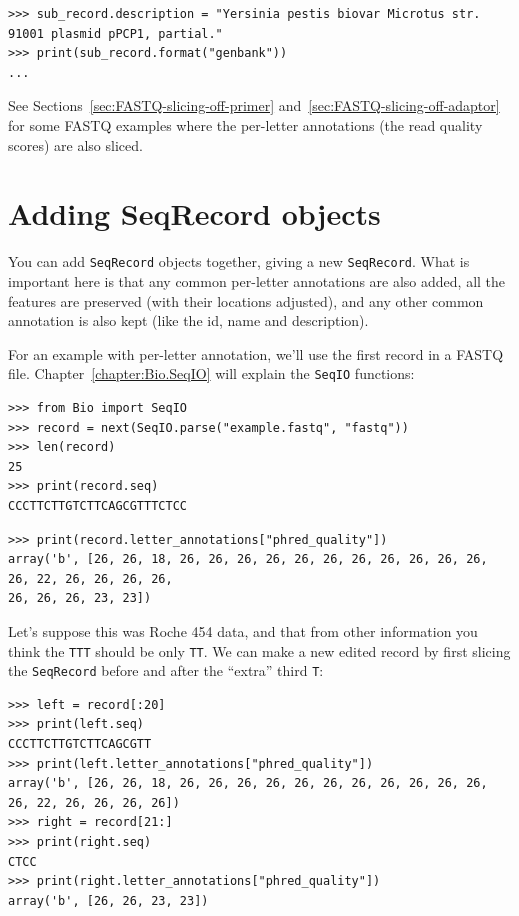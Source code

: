 \begin{verbatim}
>>> sub_record.description = "Yersinia pestis biovar Microtus str. 91001 plasmid pPCP1, partial."
>>> print(sub_record.format("genbank"))
...
\end{verbatim}

See Sections~\ref{sec:FASTQ-slicing-off-primer}
and~\ref{sec:FASTQ-slicing-off-adaptor} for some FASTQ examples where the
per-letter annotations (the read quality scores) are also sliced.

\section{Adding SeqRecord objects}
\label{sec:SeqRecord-addition}

You can add \verb|SeqRecord| objects together, giving a new \verb|SeqRecord|.
What is important here is that any common
per-letter annotations are also added, all the features are preserved (with their
locations adjusted), and any other common annotation is also kept (like the id, name
and description).

For an example with per-letter annotation, we'll use the first record in a
FASTQ file. Chapter~\ref{chapter:Bio.SeqIO} will explain the \verb|SeqIO| functions:

\begin{verbatim}
>>> from Bio import SeqIO
>>> record = next(SeqIO.parse("example.fastq", "fastq"))
>>> len(record)
25
>>> print(record.seq)
CCCTTCTTGTCTTCAGCGTTTCTCC
\end{verbatim}
\begin{verbatim}
>>> print(record.letter_annotations["phred_quality"])
array('b', [26, 26, 18, 26, 26, 26, 26, 26, 26, 26, 26, 26, 26, 26, 26, 22, 26, 26, 26, 26,
26, 26, 26, 23, 23])
\end{verbatim}

\noindent Let's suppose this was Roche 454 data, and that from other information
you think the \texttt{TTT} should be only \texttt{TT}. We can make a new edited
record by first slicing the \verb|SeqRecord| before and after the ``extra''
third \texttt{T}:

\begin{verbatim}
>>> left = record[:20]
>>> print(left.seq)
CCCTTCTTGTCTTCAGCGTT
>>> print(left.letter_annotations["phred_quality"])
array('b', [26, 26, 18, 26, 26, 26, 26, 26, 26, 26, 26, 26, 26, 26, 26, 22, 26, 26, 26, 26])
>>> right = record[21:]
>>> print(right.seq)
CTCC
>>> print(right.letter_annotations["phred_quality"])
array('b', [26, 26, 23, 23])
\end{verbatim}

